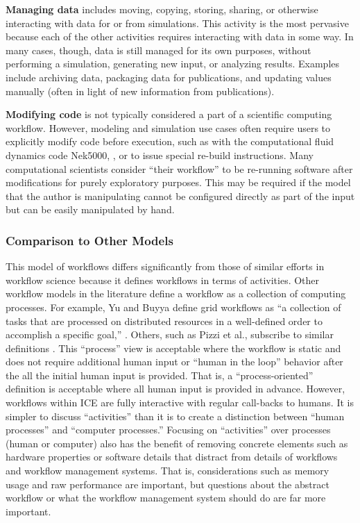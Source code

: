 \textbf{Managing data} includes moving, copying, storing, sharing, or
otherwise interacting with data for or from simulations. This activity
is the most pervasive because each of the other activities requires
interacting with data in some way. In many cases, though, data is still
managed for its own purposes, without performing a simulation,
generating new input, or analyzing results. Examples include archiving
data, packaging data for publications, and updating values manually
(often in light of new information from publications).

\textbf{Modifying code} is not typically considered a part of a
scientific computing workflow. However, modeling and simulation use
cases often require users to explicitly modify code before execution,
such as with the computational fluid dynamics code Nek5000,
\cite{the_nek5000_team_nek5000_2014}, or to issue special re-build instructions.
Many computational scientists consider ``their workflow'' to be re-running
software after modifications for purely exploratory purposes. This may
be required if the model that the author is manipulating cannot be
configured directly as part of the input but can be easily manipulated
by hand.

\subsubsection{Comparison to Other
Models}\label{comparison-to-other-models}

This model of workflows differs significantly from those of similar
efforts in workflow science because it defines workflows in terms of
activities. Other workflow models in the literature define a workflow as
a collection of computing processes. For example, Yu and Buyya define
grid workflows as ``a collection of tasks that are processed on
distributed resources in a well-defined order to accomplish a specific
goal,'' \cite{yu_taxonomy_2005}. Others, such as Pizzi et al., subscribe to
similar definitions \cite{pizzi_aiida:_2016}. This ``process'' view is
acceptable where the workflow is static and does not require additional
human input or ``human in the loop'' behavior after the all the initial
human input is provided. That is, a ``process-oriented'' definition is
acceptable where all human input is provided in advance. However,
workflows within ICE are fully interactive with regular call-backs to
humans. It is simpler to discuss ``activities'' than it is to create a
distinction between ``human processes'' and ``computer processes.''
Focusing on ``activities'' over processes (human or computer) also has
the benefit of removing concrete elements such as hardware properties or
software details that distract from details of workflows and workflow 
management systems. That is, considerations such as memory usage and 
raw performance are important, but questions about the abstract workflow 
or what the workflow management system should do are far more important.

